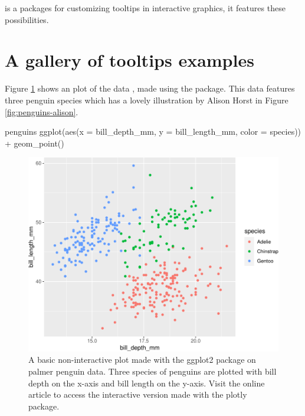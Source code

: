  is a packages for customizing tooltips in interactive
graphics, it features these possibilities.

\hypertarget{a-gallery-of-tooltips-examples}{%
\section{A gallery of tooltips
examples}\label{a-gallery-of-tooltips-examples}}

Figure \ref{fig:penguins-ggplot} shows an plot of the
 data \citep{palmerpenguins}, made using the
 package. This data features three penguin species
which has a lovely illustration by Alison Horst in Figure
\ref{fig:penguins-alison}.

\begin{Schunk}
\begin{Sinput}
penguins %
  ggplot(aes(x = bill_depth_mm, y = bill_length_mm, 
             color = species)) + 
  geom_point()
\end{Sinput}
\begin{figure}
\includegraphics{sample-article_files/figure-latex/penguins-ggplot-1} \caption[A basic non-interactive plot made with the ggplot2 package on palmer penguin data]{A basic non-interactive plot made with the ggplot2 package on palmer penguin data. Three species of penguins are plotted with bill depth on the x-axis and bill length on the y-axis. Visit the online article to access the interactive version made with the plotly package.}\label{fig:penguins-ggplot}
\end{figure}
\end{Schunk}

